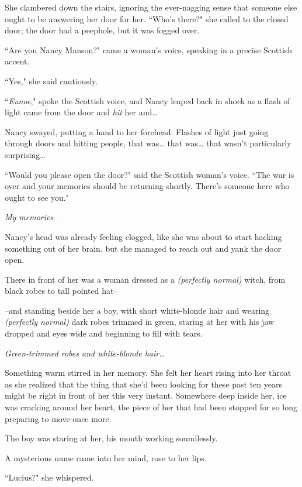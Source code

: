 She clambered down the stairs, ignoring the ever-nagging sense that someone else ought to be answering her door for her. ``Who's there?" she called to the closed door; the door had a peephole, but it was fogged over.

``Are you Nancy Manson?" came a woman's voice, speaking in a precise Scottish accent.

``Yes," she said cautiously.

``\emph{Eunoe}," spoke the Scottish voice, and Nancy leaped back in shock as a flash of light came from the door and \emph{hit} her and{\ldots}

Nancy swayed, putting a hand to her forehead. Flashes of light just going through doors and hitting people, that was{\ldots} that was{\ldots} that wasn't particularly surprising{\ldots}

``Would you please open the door?" said the Scottish woman's voice. ``The war is over and your memories should be returning shortly. There's someone here who ought to see you."

\emph{My memories}\---

Nancy's head was already feeling clogged, like she was about to start hacking something out of her brain, but she managed to reach out and yank the door open.

There in front of her was a woman dressed as a \emph{(perfectly normal)} witch, from black robes to tall pointed hat\---

\---and standing beside her a boy, with short white-blonde hair and wearing \emph{(perfectly normal)} dark robes trimmed in green, staring at her with his jaw dropped and eyes wide and beginning to fill with tears.

\emph{Green-trimmed robes and white-blonde hair{\ldots}}

Something warm stirred in her memory. She felt her heart rising into her throat as she realized that the thing that she'd been looking for these past ten years might be right in front of her this very instant. Somewhere deep inside her, ice was cracking around her heart, the piece of her that had been stopped for so long preparing to move once more.

The boy was staring at her, his mouth working soundlessly.

A mysterious name came into her mind, rose to her lips.

``Lucius?" she whispered.

